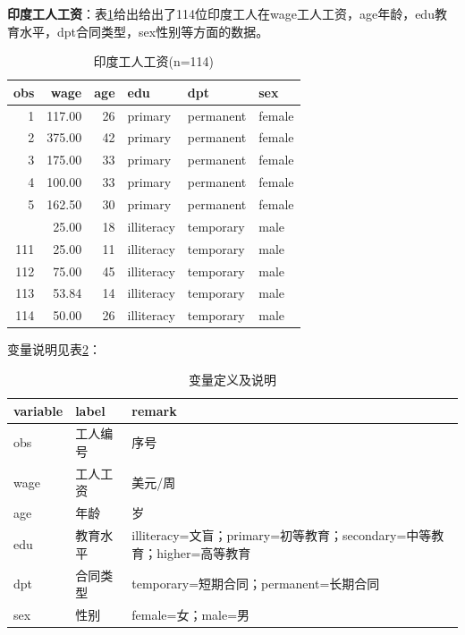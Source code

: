 \documentclass[12pt,(landscape,a4paper),(portrait,a4paper)]{article}
\theoremstyle{definition}
\theoremstyle{definition}
\theoremstyle{definition}
\theoremstyle{remark}
\begin{document}
\textbf{印度工人工资}：表\ref{tab:data-worker-lab}给出给出了114位印度工人在wage工人工资，age年龄，edu教育水平，dpt合同类型，sex性别等方面的数据。

\begin{table}

\caption{\label{tab:data-worker-lab}印度工人工资(n=114)}
\centering
\begin{tabular}[t]{rrrlll}
\toprule
obs & wage & age & edu & dpt & sex\\
\midrule
1 & 117.00 & 26 & primary & permanent & female\\
2 & 375.00 & 42 & primary & permanent & female\\
3 & 175.00 & 33 & primary & permanent & female\\
4 & 100.00 & 33 & primary & permanent & female\\
5 & 162.50 & 30 & primary & permanent & female\\
\addlinespace
110 & 25.00 & 18 & illiteracy & temporary & male\\
111 & 25.00 & 11 & illiteracy & temporary & male\\
112 & 75.00 & 45 & illiteracy & temporary & male\\
113 & 53.84 & 14 & illiteracy & temporary & male\\
114 & 50.00 & 26 & illiteracy & temporary & male\\
\bottomrule
\end{tabular}
\end{table}

变量说明见表\ref{tab:label-worker-lab}：

\begin{table}

\caption{\label{tab:label-worker-lab}变量定义及说明}
\centering
\begin{tabular}[t]{l|l|l}
\hline
variable & label & remark\\
\hline
obs & 工人编号 & 序号\\
\hline
wage & 工人工资 & 美元/周\\
\hline
age & 年龄 & 岁\\
\hline
edu & 教育水平 & illiteracy=文盲；primary=初等教育；secondary=中等教育；higher=高等教育\\
\hline
dpt & 合同类型 & temporary=短期合同；permanent=长期合同\\
\hline
sex & 性别 & female=女；male=男\\
\hline
\end{tabular}
\end{table}
\end{document}
